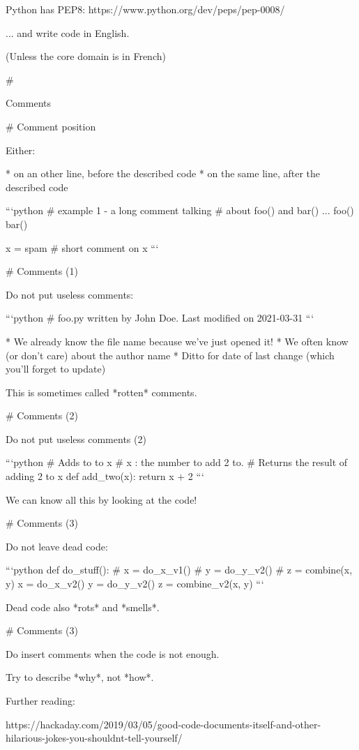 Python has PEP8:  https://www.python.org/dev/peps/pep-0008/

... and write code in English.

(Unless the core domain is in French)

#

\huge \center Comments

# Comment position

Either:

* on an other line, before the described code
* on the same line, after the described code

\vfill

```python
# example 1 - a long comment talking
# about foo() and bar() ...
foo()
bar()

x = spam  # short comment on x
```


# Comments (1)

Do not put useless comments:

```python
# foo.py written by John Doe. Last modified on 2021-03-31
```

* We already know the file name because  we've just opened it!
* We often know (or don't care) about the author name
* Ditto for date of last change (which you'll forget to update)

\vfill

This is sometimes called *rotten* comments.

# Comments (2)

Do not put useless comments (2)

```python
# Adds to to x
# x : the number to add 2 to.
# Returns the result of adding 2 to x
def add_two(x):
    return x + 2
```

\vfill

We can know all this by looking at the code!

# Comments (3)

Do not leave dead code:

```python
def do_stuff():
    # x = do_x_v1()
    # y = do_y_v2()
    # z = combine(x, y)
    x = do_x_v2()
    y = do_y_v2()
    z = combine_v2(x, y)
```

Dead code also *rots* and *smells*.


# Comments (3)

Do insert comments when the code is not enough.

Try to describe *why*, not *how*.

Further reading:

https://hackaday.com/2019/03/05/good-code-documents-itself-and-other-hilarious-jokes-you-shouldnt-tell-yourself/


